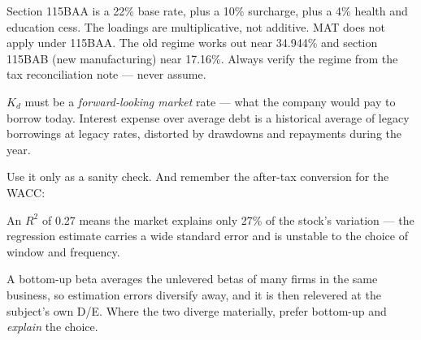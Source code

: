 \documentclass[11pt,a4paper]{article}
\begin{document}
\begin{soln}
Section 115BAA is a 22\% base rate, plus a 10\% surcharge, plus a 4\% health and
education cess. The loadings are multiplicative, not additive.
MAT does not apply under 115BAA. The old regime works out near 34.944\% and section
115BAB (new manufacturing) near 17.16\%. Always verify the regime from the tax
reconciliation note --- never assume.
\end{soln}

\begin{soln}
$K_d$ must be a \emph{forward-looking market} rate --- what the company would pay to
borrow today. Interest expense over average debt is a historical average of legacy
borrowings at legacy rates, distorted by drawdowns and repayments during the year.\par
Use it only as a sanity check. And remember the after-tax conversion for the WACC:
\end{soln}

\begin{soln}
An $R^2$ of 0.27 means the market explains only 27\% of the stock's variation --- the
regression estimate carries a wide standard error and is unstable to the choice of
window and frequency.\par
A bottom-up beta averages the unlevered betas of many firms in the same business, so
estimation errors diversify away, and it is then relevered at the subject's own D/E.
Where the two diverge materially, prefer bottom-up and \emph{explain} the choice.
\end{soln}
\end{document}
